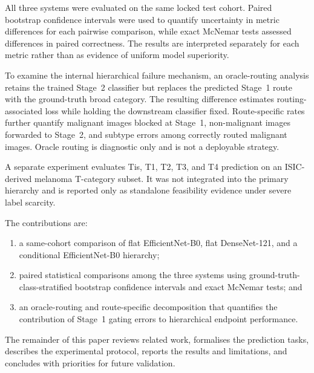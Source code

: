 All three systems were evaluated on the same locked test cohort. Paired
bootstrap confidence intervals were used to quantify uncertainty in metric
differences for each pairwise comparison, while exact McNemar tests assessed
differences in paired correctness. The results are interpreted separately
for each metric rather than as evidence of uniform model superiority.

To examine the internal hierarchical failure mechanism, an oracle-routing
analysis retains the trained Stage~2 classifier but replaces the predicted
Stage~1 route with the ground-truth broad category. The resulting difference
estimates routing-associated loss while holding the downstream classifier
fixed. Route-specific rates further quantify malignant images blocked at
Stage~1, non-malignant images forwarded to Stage~2, and subtype errors among
correctly routed malignant images. Oracle routing is diagnostic only and is
not a deployable strategy.

A separate experiment evaluates Tis, T1, T2, T3, and T4 prediction on an
ISIC-derived melanoma T-category subset. It was not integrated into the
primary hierarchy and is reported only as standalone feasibility evidence
under severe label scarcity.

The contributions are:

\begin{enumerate}
    \item a same-cohort comparison of flat EfficientNet-B0, flat
    DenseNet-121, and a conditional EfficientNet-B0 hierarchy;

    \item paired statistical comparisons among the three systems using
    ground-truth-class-stratified bootstrap confidence intervals and exact
    McNemar tests; and

    \item an oracle-routing and route-specific decomposition that quantifies
    the contribution of Stage~1 gating errors to hierarchical endpoint
    performance.
\end{enumerate}

The remainder of this paper reviews related work, formalises the prediction
tasks, describes the experimental protocol, reports the results and
limitations, and concludes with priorities for future validation.
